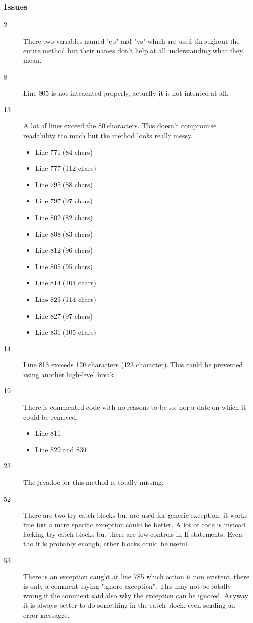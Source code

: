 			\subsubsection{Issues}
			\begin{description}
				\item[2] There two variables named "ep" and "vs" which are used throughout the entire method but their names don't help at all understanding what they mean.
				\item[8] Line 805 is not intedented properly, actually it is not intented at all.
				\item[13] A lot of lines exceed the 80 characters. This doesn't compromise readability too much but the method looks really messy.
					\begin{itemize}
						\item Line 771 (84 chars)
						\item Line 777 (112 chars)
						\item Line 795 (88 chars)
						\item Line 797 (97 chars)
						\item Line 802 (82 chars)
						\item Line 808 (83 chars)
						\item Line 812 (96 chars)
						\item Line 805 (95 chars)
						\item Line 814 (104 chars)
						\item Line 823 (114 chars)
						\item Line 827 (97 chars)
						\item Line 831 (105 chars)
					\end{itemize}
				\item[14] Line 813 exceeds 120 characters (123 character). This could be prevented using another high-level break.
				\item[19] There is commented code with no reasons to be so, nor a date on which it could be removed.
				\begin{itemize}
					\item Line 811
					\item Line 829 and 830
				\end{itemize}
				\item[23] The javadoc for this method is totally missing.
				\item[52] There are two try-catch blocks but are used for generic exception, it works fine but a more specific exception could be better. A lot of code is instead lacking
				try-catch blocks but there are few controls in If statements. Even tho it is probably enough, other blocks could be useful.
				\item[53] There is an exception caught at line 785 which action is non existent, there is only a comment saying "ignore exception". This may not be totally wrong if
				the comment said also why the exception can be ignored. Anyway it is always better to do something in the catch block, even sending an error messagge.
			\end{description}
		\newpage
